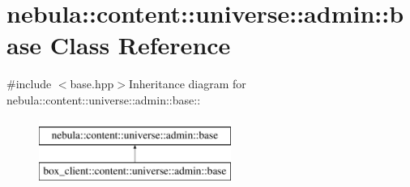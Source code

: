 \hypertarget{classnebula_1_1content_1_1universe_1_1admin_1_1base}{
\section{nebula::content::universe::admin::base Class Reference}
\label{classnebula_1_1content_1_1universe_1_1admin_1_1base}
}


{\ttfamily \#include $<$base.hpp$>$}Inheritance diagram for nebula::content::universe::admin::base::\begin{figure}[H]
\begin{center}
\leavevmode
\includegraphics[height=2cm]{classnebula_1_1content_1_1universe_1_1admin_1_1base}
\end{center}
\end{figure}
